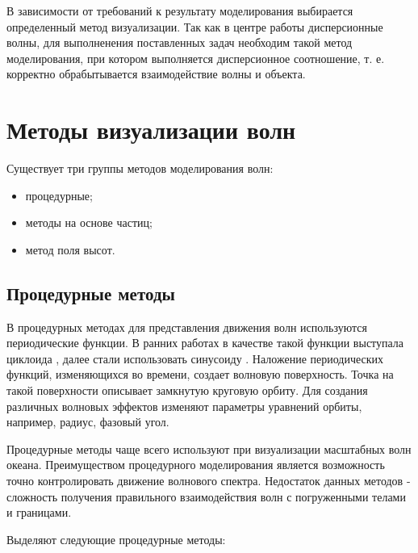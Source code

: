 В зависимости от требований к результату моделирования выбирается определенный метод визуализации. Так как в центре работы дисперсионные волны, для выполненения поставленных задач необходим такой метод моделирования, при котором выполняется дисперсионное соотношение, т. е. корректно обрабытывается взаимодействие волны и объекта.

\section{Методы визуализации волн}

Существует три группы методов моделирования волн:

\begin{itemize}
    \item процедурные;
    \item методы на основе частиц;
    \item метод поля высот.
\end{itemize}

\subsection{Процедурные методы}

В процедурных методах для представления движения волн используются периодические функции. В ранних работах в качестве такой функции выступала циклоида \cite{orbit-procedure}, далее стали использовать синусоиду \cite{spectrum-darles}. Наложение периодических функций, изменяющихся во времени, создает волновую поверхность. Точка на такой поверхности описывает замкнутую круговую орбиту. Для создания различных волновых эффектов изменяют параметры уравнений орбиты, например, радиус, фазовый угол.

Процедурные методы чаще всего используют при визуализации масштабных волн океана. Преимуществом процедурного моделирования является возможность точно контролировать движение волнового спектра. Недостаток данных методов - сложность получения правильного взаимодействия волн с погруженными телами и границами.  

Выделяют следующие процедурные методы:


